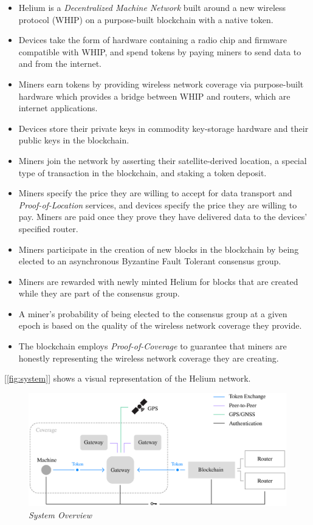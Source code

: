\documentclass[10pt, nonatbib, nocopyrightspace, reprint]{sigplanconf}
\newcommand{\figref}[1]{[\autoref{#1}]}
\begin{document}
\begin{itemize}
    \item Helium is a \emph{Decentralized Machine Network} built around a new wireless protocol (WHIP) on a purpose-built blockchain with a native token.
    \item Devices take the form of hardware containing a radio chip and firmware compatible with WHIP, and spend tokens by paying miners to send data to and from the internet.
    \item Miners earn tokens by providing wireless network coverage via purpose-built hardware which provides a bridge between WHIP and routers, which are internet applications.
    \item Devices store their private keys in commodity key-storage hardware and their public keys in the blockchain.
    \item Miners join the network by asserting their satellite-derived location, a special type of transaction in the blockchain, and staking a token deposit.
    \item Miners specify the price they are willing to accept for data transport and \emph{Proof-of-Location} services, and devices specify the price they are willing to pay. Miners are paid once they prove they have delivered data to the devices' specified router.
    \item Miners participate in the creation of new blocks in the blockchain by being elected to an asynchronous Byzantine Fault Tolerant consensus group.
    \item Miners are rewarded with newly minted Helium for blocks that are created while they are part of the consensus group. 
    \item A miner's probability of being elected to the consensus group at a given epoch is based on the quality of the wireless network coverage they provide.
    \item The blockchain employs \emph{Proof-of-Coverage} to guarantee that miners are honestly representing the wireless network coverage they are creating.
\end{itemize}

\figref{fig:system} shows a visual representation of the Helium network.

\begin{figure}[ht]
    \begin{center}
          \includegraphics[width=\textwidth]{schematic.eps}
          \caption{\emph{System Overview}}
          \label{fig:system}
     \end{center}
\end{figure}
\end{document}
